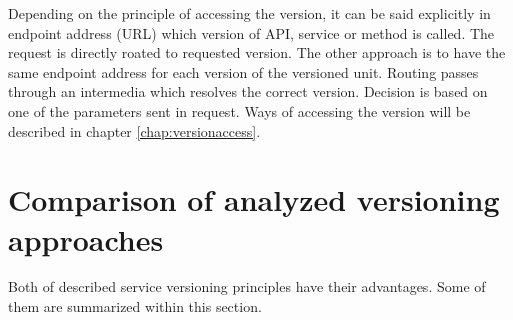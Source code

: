 Depending on the principle of accessing the version, it can be said explicitly in endpoint address (URL) which version of API, service or method is called. The request is directly roated to requested version. The other approach is to have the same endpoint address for each version of the versioned unit. Routing passes through an intermedia which resolves the correct version. Decision is based on one of the parameters sent in request. Ways of accessing the version will be described in chapter \ref{chap:versionaccess}.


\section{Comparison of analyzed versioning approaches}
Both of described service versioning principles have their advantages. Some of them are summarized within this section. 

